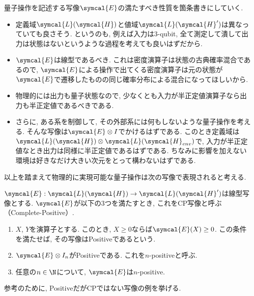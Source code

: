

量子操作を記述する写像$\symcal{E}$の満たすべき性質を箇条書きにしていく. 

\begin{itemize}
  \item 定義域$\symcal{L}(\symcal{H})$と値域$\symcal{L}(\symcal{H}')$は異なっていても良さそう. 
  というのも, 例えば入力は3-qubit, 全て測定して潰して出力は状態はないというような過程を考えても良いはずだから. 
  \item $\symcal{E}$は線型であるべき. 
  これは密度演算子は状態の古典確率混合であるので, $\symcal{E}$による操作で出てくる密度演算子は元の状態が$\symcal{E}$で遷移したものの同じ確率分布による混合になってほしいから. 
  \item 物理的には出力も量子状態なので, 少なくとも入力が半正定値演算子なら出力も半正定値であるべきである. 
  \item さらに, ある系を制御して, その外部系には何もしないような量子操作を考える. 
  そんな写像は$\symcal{E}\otimes I$でかけるはずである. 
  このとき定義域は$\symcal{L}(\symcal{H})\otimes\symcal{L}(\symcal{H}_{env})$で, 入力が半正定値なとき出力は同様に半正定値であるはずである. 
  ちなみに影響を加えない環境は好きなだけ大きい次元をとって構わないはずである. 
\end{itemize}

以上を踏まえて物理的に実現可能な量子操作は次の写像で表現されると考える. 

\begin{mydfn}[CP写像]\label{dfn.CP-map}
  $\symcal{E}:\symcal{L}(\symcal{H})\to\symcal{L}(\symcal{H}')$は線型写像とする. 
  $\symcal{E}$が以下の3つを満たすとき, これをCP写像と呼ぶ（Complete-Positive）. 
  \begin{enumerate}
    \item $X$, $Y$を演算子とする. 
    このとき, $X\geq 0$ならば$\symcal{E}(X)\geq 0$. 
    この条件を満たせば, その写像はPositiveであるという. 
    \item $\symcal{E}\otimes I_n$がPositiveである. 
    これを$n$-positiveと呼ぶ. 
    \item 任意の$n\in \N$について, $\symcal{E}$は$n$-positive. 
  \end{enumerate}
\end{mydfn}

参考のために, PositiveだがCPではない写像の例を挙げる. 

